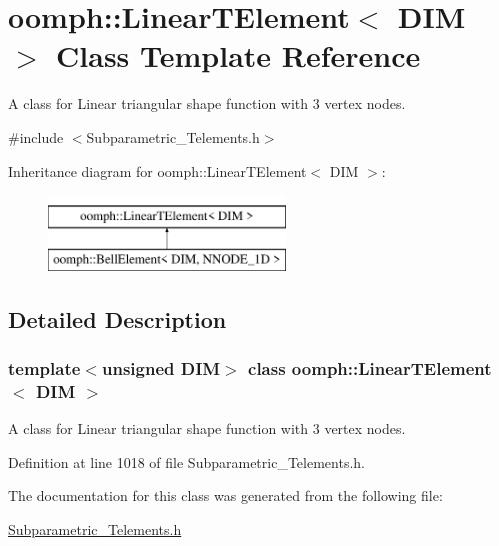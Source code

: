 \hypertarget{classoomph_1_1LinearTElement}{}\section{oomph\+:\+:Linear\+T\+Element$<$ D\+IM $>$ Class Template Reference}
\label{classoomph_1_1LinearTElement}


A class for Linear triangular shape function with 3 vertex nodes.  




{\ttfamily \#include $<$Subparametric\+\_\+\+Telements.\+h$>$}

Inheritance diagram for oomph\+:\+:Linear\+T\+Element$<$ D\+IM $>$\+:\begin{figure}[H]
\begin{center}
\leavevmode
\includegraphics[height=2.000000cm]{classoomph_1_1LinearTElement}
\end{center}
\end{figure}


\subsection{Detailed Description}
\subsubsection*{template$<$unsigned D\+IM$>$\newline
class oomph\+::\+Linear\+T\+Element$<$ D\+I\+M $>$}

A class for Linear triangular shape function with 3 vertex nodes. 

Definition at line 1018 of file Subparametric\+\_\+\+Telements.\+h.



The documentation for this class was generated from the following file\+:\begin{DoxyCompactItemize}
\item 
\hyperlink{Subparametric__Telements_8h}{Subparametric\+\_\+\+Telements.\+h}\end{DoxyCompactItemize}
